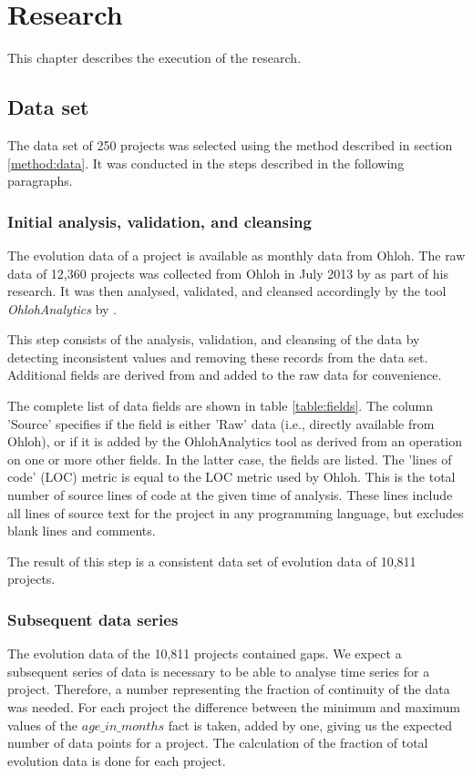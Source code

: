\chapter{Research}
\label{research}

This chapter describes the execution of the research.

\section{Data set}
The data set of 250 projects was selected using the method described in section
\ref{method:data}. It was conducted in the steps described in the following
paragraphs.

\subsection{Initial analysis, validation, and cleansing}
The evolution data of a project is available as monthly data from Ohloh. The
raw data of 12,360 projects was collected from Ohloh in July 2013 by
\citet{bruntink2014} as part of his research. It was then analysed, validated,
and cleansed accordingly by the tool \emph{OhlohAnalytics }\rm
by \citet{ohlohanalytics}.

This step consists of the analysis, validation, and cleansing of the data by
detecting inconsistent values and removing these records from the data set.
Additional fields are derived from and added to the raw data for convenience.

The complete list of data fields are shown in table \ref{table:fields}. The
column 'Source' specifies if the field is either 'Raw' data (i.e., directly
available from Ohloh), or if it is added by the OhlohAnalytics tool as derived
from an operation on one or more other fields. In the latter case, the fields
are listed. The 'lines of code' (LOC) metric is equal to the LOC metric used by
Ohloh. This is the total number of source lines of code at the given time of
analysis. These lines include all lines of source text for the project in any
programming language, but excludes blank lines and comments.

The result of this step is a consistent data set of evolution data of 10,811
projects.



\subsection{Subsequent data series}
The evolution data of the 10,811 projects contained gaps. We expect a
subsequent series of data is necessary to be able to analyse time series for a
project. Therefore, a number representing the fraction of continuity of the
data was needed. For each project the difference between the minimum and
maximum values of the $age\_in\_months$ fact is taken, added by one, giving us
the expected number of data points for a project. The calculation of the
fraction of total evolution data is done for each project.

